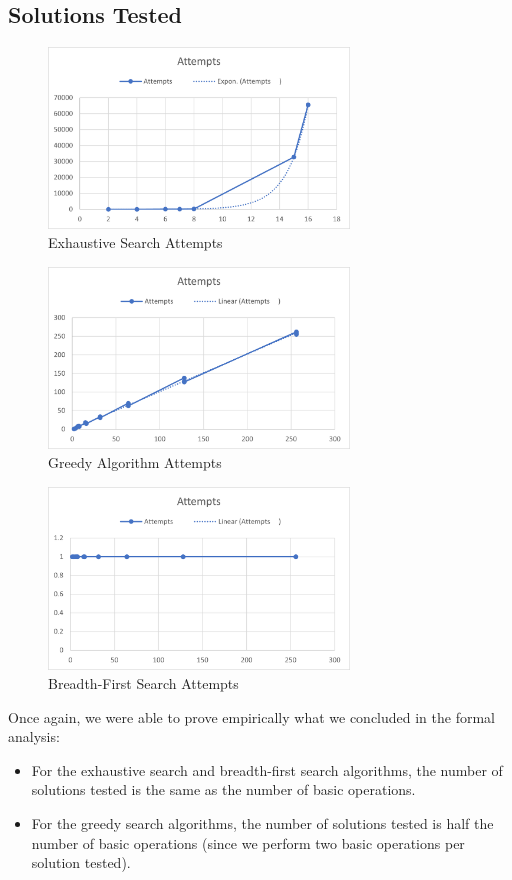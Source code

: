 \documentclass[]{revdetua}
\begin{document}
\subsection{Solutions Tested}

\begin{figure}[H]
    \centering
    \includegraphics[width=8cm]{Exhaustive Search/Attempts.png}
    \caption{Exhaustive Search Attempts}
\end{figure}

\begin{figure}[H]
    \centering
    \includegraphics[width=8cm]{Greedy Algorithm/Attempts.png}
    \caption{Greedy Algorithm Attempts}
\end{figure}

\begin{figure}[H]
    \centering
    \includegraphics[width=8cm]{Breadth-First/Attempts.png}
    \caption{Breadth-First Search Attempts}
\end{figure}

Once again, we were able to prove empirically what we concluded in the formal analysis:
\begin{itemize}
\item For the exhaustive search and breadth-first search algorithms, the number of solutions tested is the same as the number of basic operations.
\item For the greedy search algorithms, the number of solutions tested is half the number of basic operations (since we perform two basic operations per solution tested).
\end{itemize}
\end{document}
